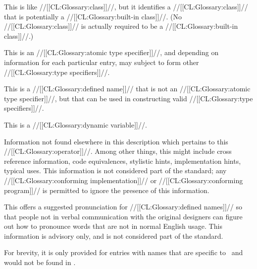 This is like //[[CL:Glossary:class]]//, but it identifies a //[[CL:Glossary:class]]// that is potentially
a //[[CL:Glossary:built-in class]]//.  (No //[[CL:Glossary:class]]// is actually required to be a
//[[CL:Glossary:built-in class]]//.)


This is an //[[CL:Glossary:atomic type specifier]]//,
and depending on information for each particular entry,
may subject to form other //[[CL:Glossary:type specifiers]]//.


This is a //[[CL:Glossary:defined name]]// that is not an //[[CL:Glossary:atomic type specifier]]//,
but that can be used in constructing valid //[[CL:Glossary:type specifiers]]//.


This is a //[[CL:Glossary:dynamic variable]]//.

\endlist

\endsubsubsection%


Information not found elsewhere in this description
which pertains to this //[[CL:Glossary:operator]]//.
Among other things, this might include 
 cross reference information,
 code equivalences, 
 stylistic hints,
 implementation hints,
 typical uses.
This information is not considered part of the standard;
any //[[CL:Glossary:conforming implementation]]// or //[[CL:Glossary:conforming program]]//
is permitted to ignore the presence of this information.

\endsubsubsection%


This offers a suggested pronunciation for //[[CL:Glossary:defined names]]// 
so that people not in verbal communication with the original designers
can figure out how to pronounce words that are not in normal English usage.
This information is advisory only, and is not considered part of the standard.

For brevity, it is only provided for entries with names that are specific to
\clisp\ and would not be found in {\WebstersDictionary}.

\endsubsubsection%

